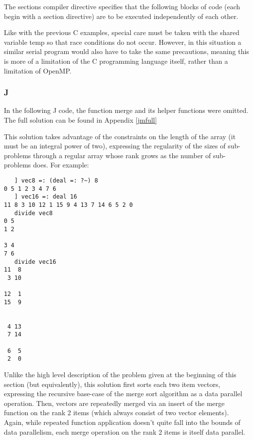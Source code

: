 \begin{singlespacing}
\begin{small}

\end{small}
\end{singlespacing}

The \ttfamily sections \normalfont compiler directive %
specifies that the following blocks of code (each begin with a \ttfamily section \normalfont directive) 
are to be executed independently of each other.

Like with the previous C examples, special care must be taken with the shared variable \ttfamily temp \normalfont 
so that race conditions do not occur.
However, in this situation a similar serial program would also have to take the same precautions, 
meaning this is more of a limitation of the C programming language itself, rather than a limitation of OpenMP.

\subsubsection{J}
\label{jmerge}
In the following J code, the function \ttfamily merge \normalfont and its helper functions were omitted.
The full solution can be found in Appendix \ref{jmfull}

\begin{singlespacing}
\begin{small}

\end{small}
\end{singlespacing}

This solution takes advantage of the constraints on the length of the array (it must be an integral power of two), 
expressing the regularity of the sizes of sub-problems through a regular array 
whose rank grows as the number of sub-problems does.
For example: 

\begin{singlespacing}
\begin{small}
\begin{verbatim}
   ] vec8 =: (deal =: ?~) 8
0 5 1 2 3 4 7 6
   ] vec16 =: deal 16
11 8 3 10 12 1 15 9 4 13 7 14 6 5 2 0
   divide vec8
0 5
1 2

3 4
7 6
   divide vec16
11  8
 3 10

12  1
15  9


 4 13
 7 14

 6  5
 2  0
\end{verbatim}
\end{small}
\end{singlespacing}

Unlike the high level description of the problem given at the beginning of this section (but equivalently), 
this solution first sorts each two item vectors, 
expressing the recursive base-case of the merge sort algorithm as a data parallel operation.
Then, vectors are repeatedly merged via an insert of the \ttfamily merge \normalfont function on the rank 2 items 
(which always consist of two vector elements).
Again, while repeated function application doesn't quite fall into the bounds of data parallelism, 
each merge operation on the rank 2 items is itself data parallel.
